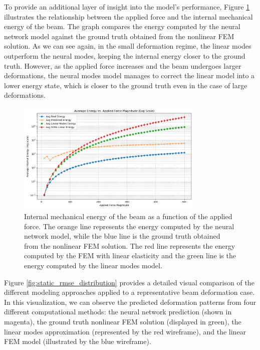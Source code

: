 To provide an additional layer of insight into the model's performance, Figure \ref{fig:static_energy_beam} illustrates the relationship between the applied force and the internal mechanical energy of the beam. The graph compares the energy computed by the neural network model against the ground truth obtained from the nonlinear FEM solution. As we can see again, in the small deformation regime, the linear modes outperform the neural modes, keeping the internal energy closer  to the ground truth. However, as the applied force increases and the beam undergoes larger deformations, the neural modes model manages to correct the linear model into a lower energy state, which is closer to the ground truth even in the case of large deformations. 
\begin{figure}[ht]
    \centering
    \includegraphics[width=0.8\textwidth]{Images/beam_static_energy.png}
    \caption{Internal mechanical energy of the beam as a function of the applied force. The orange line represents the energy computed by the neural network model, while the blue line is the ground truth obtained from the nonlinear FEM solution. The red line represents the energy computed by the FEM with linear elasticity and the green line is the energy computed by the linear modes model.}
    \label{fig:static_energy_beam}
\end{figure}


Figure \ref{fig:static_rmse_distribution} provides a detailed visual comparison of the different modeling approaches applied to a representative beam deformation case. In this visualization, we can observe the predicted deformation patterns from four different computational methods: the neural network prediction (shown in magenta), the ground truth nonlinear FEM solution (displayed in green), the linear modes approximation (represented by the red wireframe), and the linear FEM model (illustrated by the blue wireframe). 

